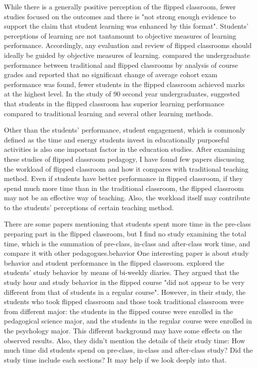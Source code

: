 \documentclass[11pt,a4paper]{article}
\begin{document}
While there is a generally positive perception of the flipped classroom, fewer studies focused on the outcomes and there is "not strong enough evidence to support the claim that student learning was enhanced by this format"\cite{DeLozier:2016}.
Students' perceptions of learning are not tantamount to objective measures of learning performance. Accordingly, any evaluation and review of flipped classrooms should ideally be guided by objective measures of learning.
\cite{Blair:2016} compared the undergraduate performance between traditional and flipped classrooms by analysis of course grades and reported that no significant change  of average cohort exam performance was found, fewer students in the flipped classroom achieved marks at the highest level.
In the study of 90 second year undergraduates, \cite{Thai:2017} suggested that students in the flipped classroom has superior learning performance compared to traditional learning and several other learning methods. 

Other than the students' performance, student engagement, which is commonly defined as the time and energy students invest in educationally purposeful activities is also one important factor in the education studies.
After examining these studies of flipped classroom pedagogy, I have  found few papers discussing the workload of flipped classroom and how it compares with traditional teaching method.
Even if students have better performance in flipped classroom, if they spend much more time than in the traditional classroom, the  flipped classroom may not be an effective way of teaching.
Also, the workload itself may contribute to the students' perceptions of certain teaching method.

There are some papers mentioning that students spent more time in the pre-class preparing part in the flipped classroom\cite{Blair:2016}, but I find no study examining the total time, which is the summation of pre-class, in-class and after-class work time, and compare it with other pedagogues.behavior
One interesting paper is about study behavior and student performance in the flipped classroom.
\cite{Boevé:2016} explored the students' study behavior by means of bi-weekly diaries.
They argued that the study hour and study behavior in the flipped course "did not appear to be very different from that of students in a regular course".
However, in their study, the students who took flipped classroom and those took traditional classroom were from different major: the students in the flipped course were enrolled in the pedagogical science major, and the students in the regular course were enrolled in the psychology major. 
This different background may have some effects on the observed results.
Also, they didn't mention the details of their study time: How much time did students spend on pre-class, in-class and after-class study? 
Did the study time include each sections?
It may help if we look deeply into that.
\end{document}
